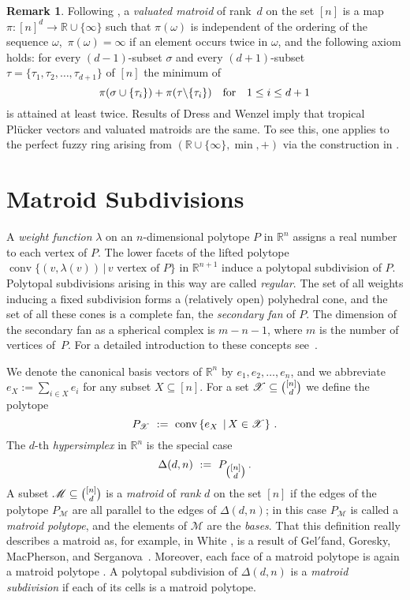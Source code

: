 \documentclass[12pt,a4paper]{amsart}
\theoremstyle{definition}
\newtheorem{remark}[thm]{Remark}
\newcommand{\R}{{\mathbb{R}}}
\providecommand\cM{{\mathscr{M}}}
\providecommand\cX{{\mathscr{X}}}
\providecommand{\MatroidPolytope}[1]{P_{#1}}
\providecommand{\SetOf}[2]{\left\{#1\vphantom{#2}\,\right.\left|\,\vphantom{#1}#2\right\}}
\providecommand{\smallSetOf}[2]{\{#1\,|\,#2\}}
\DeclareMathOperator{\conv}{conv}
\providecommand\cprime{$'$}
\begin{document}
\begin{remark} \label{rem:DW} Following \cite{DW1,DW2}, a
  \emph{valuated matroid} of rank~$d$ on the set $[n]$ is a map
  $\pi:[n]^d\to\R\cup\{\infty\}$ such that $\pi(\omega)$ is
  independent of the ordering of the sequence $\omega$,
  $\,\pi(\omega)=\infty$ if an element occurs twice in $\omega$, and
  the following axiom holds: for every $(d - 1)$-subset $\sigma$ and
  every $(d + 1)$-subset $\tau=\{\tau_1,\tau_2,\ldots,\tau_{d+1}\}$ of
  $[n]$ the minimum of
  \[
  \pi(\sigma\cup\{\tau_i\})+\pi(\tau\backslash\{\tau_i\})
  \quad \hbox{for} \quad 1\le i\le d+1
  \]
  is attained at least twice.  Results of Dress and Wenzel \cite{DW1} 
  imply that
  tropical Pl\"ucker vectors and valuated matroids are the same.  To
  see this, one applies \cite[Theorem~3.4]{DW1} to the perfect
  fuzzy ring arising from $(\R\cup\{\infty\},\min,+)$ via the
  construction in \cite[page~182]{DW1}.
\end{remark}


\section{Matroid Subdivisions}\label{sec:matroids}

A \emph{weight function} $\lambda$ on an $n$-dimensional polytope $P$
in $\R^n$ assigns a real number to each vertex of $P$.  The lower
facets of the lifted polytope $\conv\smallSetOf{(v,\lambda(v))}{v
  \text{ vertex of } P}$ in $\R^{n+1}$ induce a polytopal subdivision
of $P$.  Polytopal subdivisions arising in this way are called
\emph{regular}. The set of all weights inducing a fixed subdivision
forms a (relatively open) polyhedral cone, and the set of all these
cones is a complete fan, the \emph{secondary fan} of $P$.  The
dimension of the secondary fan as a spherical complex is $m-n-1$,
where $m$ is the number of vertices of~$P$. For a detailed
introduction to these concepts see~\cite{DRS}.

We denote the canonical basis vectors of $\R^n$ by
$e_1,e_2,\dots,e_n$, and we abbreviate $e_X:=\sum_{i\in X}e_i$ for any
subset $X\subseteq[n]$. For a set $\cX\subseteq\tbinom{[n]}{d}$ we
define the polytope
\[
\MatroidPolytope{\cX} \ := \ \conv\SetOf{e_X}{X\in\cX} \, .
\]
The $d$-th
\emph{hypersimplex} in $\R^n$ is the special case
\[
\Delta(d,n) \ := \ \MatroidPolytope{\tbinom{[n]}{d}} \, .
\]
A subset $\cM\subseteq\tbinom{[n]}{d}$ is a \emph{matroid} of
\emph{rank} $d$ on the set $[n]$ if the edges of the polytope
$\MatroidPolytope{\cM}$ are all parallel to the edges of
$\Delta(d,n)$; in this case $\MatroidPolytope{\cM}$ is called a
\emph{matroid polytope}, and the elements of $\cM$ are the
\emph{bases}.  That this definition really describes a matroid as, for
example, in White \cite{White86}, is a result of Gel{\cprime}fand,
Goresky, MacPherson, and Serganova~\cite{GGMS87}.  Moreover, each face
of a matroid polytope is again a matroid polytope \cite{FS}.  A polytopal
subdivision of $\Delta(d,n)$ is a \emph{matroid subdivision} if
each of its cells is a matroid polytope.
\end{document}
